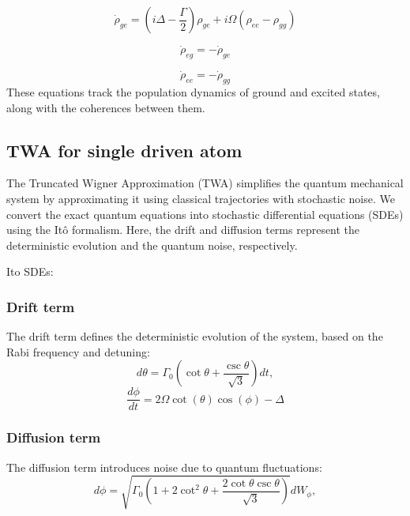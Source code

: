 \documentclass{article}
\begin{document}
    \begin{equation}
        \dot{\rho}_{ge} = \left(i \Delta - \frac{\Gamma}{2}\right) \rho_{ge} + i \Omega (\rho_{ee} - \rho_{gg})
    \end{equation}
    
    \begin{equation}
        \dot{\rho}_{eg} = -\dot{\rho}_{ge}
    \end{equation}
    
    \begin{equation}
        \dot{\rho}_{ee} = -\dot{\rho}_{gg}
    \end{equation}
    These equations track the population dynamics of ground and excited states, along with the coherences between them.

    \subsection{TWA for single driven atom}
    The Truncated Wigner Approximation (TWA) simplifies the quantum mechanical system by approximating it using classical trajectories with stochastic noise. We convert the exact quantum equations into stochastic differential equations (SDEs) using the Itô formalism. Here, the drift and diffusion terms represent the deterministic evolution and the quantum noise, respectively.

    Ito SDEs:
    \subsubsection{Drift term}
    The drift term defines the deterministic evolution of the system, based on the Rabi frequency and detuning:
    \begin{equation}
        d\theta = \Gamma_0 \left( \cot \theta + \frac{\csc \theta}{\sqrt{3}} \right) dt, \tag{16a}
    \end{equation}
    \begin{equation}
        \frac{d\phi}{dt} = 2 \Omega \cot(\theta) \cos(\phi) - \Delta
    \end{equation}
    
    \subsubsection{Diffusion term}
    The diffusion term introduces noise due to quantum fluctuations:
    \begin{equation}
        d\phi = \sqrt{\Gamma_0 \left( 1 + 2 \cot^2 \theta + \frac{2 \cot \theta \csc \theta}{\sqrt{3}} \right)} dW_\phi, \tag{16b}
    \end{equation}
    
\end{document}
